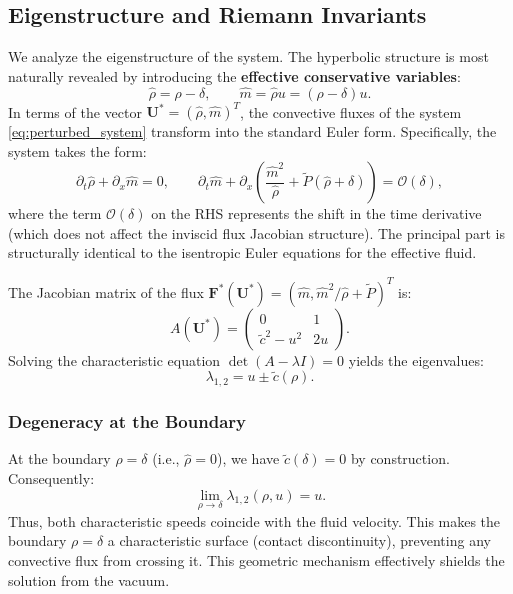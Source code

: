 \documentclass[12pt, reqno]{article}
\theoremstyle{definition}
\newcommand{\pa}{\partial}
\numberwithin{equation}{section}
\begin{document}
\subsection{Eigenstructure and Riemann Invariants}

We analyze the eigenstructure of the system. The hyperbolic structure is most naturally revealed by introducing the \textbf{effective conservative variables}:
\[
\hat{\rho} = \rho - \delta,\qquad \hat{m} = \hat{\rho} u = (\rho - \delta)u.
\]
In terms of the vector $\mathbf{U}^* = (\hat{\rho}, \hat{m})^T$, the convective fluxes of the system \eqref{eq:perturbed_system} transform into the standard Euler form. Specifically, the system takes the form:
\begin{equation} \label{eq:effective_system}
    \pa_t \hat{\rho} + \pa_x \hat{m} = 0,\qquad 
    \pa_t \hat{m} + \pa_x \left( \frac{\hat{m}^2}{\hat{\rho}} + \tilde{P}(\hat{\rho}+\delta) \right) = \mathcal{O}(\delta),
\end{equation}
where the term $\mathcal{O}(\delta)$ on the RHS represents the shift in the time derivative (which does not affect the inviscid flux Jacobian structure). The principal part is structurally identical to the isentropic Euler equations for the effective fluid.

The Jacobian matrix of the flux $\mathbf{F}^*(\mathbf{U}^*) = (\hat{m}, \hat{m}^2/\hat{\rho} + \tilde{P})^T$ is:
\[
A(\mathbf{U}^*) = \begin{pmatrix}
0 & 1 \\
\tilde{c}^2 - u^2 & 2u
\end{pmatrix}.
\]
Solving the characteristic equation $\det(A-\lambda I)=0$ yields the eigenvalues:
\begin{equation}
    \lambda_{1,2} = u \pm \tilde{c}(\rho).
\end{equation}

\subsubsection*{Degeneracy at the Boundary}
At the boundary $\rho = \delta$ (i.e., $\hat{\rho}=0$), we have $\tilde{c}(\delta)=0$ by construction. Consequently:
\[
\lim_{\rho\to\delta} \lambda_{1,2}(\rho, u) = u.
\]
Thus, both characteristic speeds coincide with the fluid velocity. This makes the boundary $\rho=\delta$ a characteristic surface (contact discontinuity), preventing any convective flux from crossing it.  This geometric mechanism effectively shields the solution from the vacuum.
\end{document}
